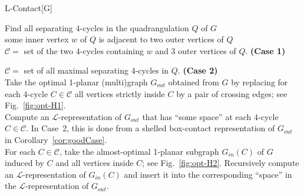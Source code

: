 \documentclass{article}
\newcommand{\LL}{$\mathcal{L}$\xspace}
\begin{document}
\hspace{-0.02\textwidth}
\parbox{0.97\textwidth}
{
\begin{algorithm}{L-Contact}[G]
	{
}



	Find all separating $4$-cycles in the quadrangulation $Q$ of $G$\\

	\qif some inner vertex $w$ of $Q$ is adjacent to two outer vertices of $Q$\\

		\qthen
		$\mathcal{C}=$ set of the two $4$-cycles containing $w$ and 3 outer vertices of $Q$.
		 \textbf{(Case 1)}

		\qelse
		$\mathcal{C}=$ set of all maximal separating $4$-cycles in $Q$.
		\textbf{(Case 2)}
	\qfi\\

	Take the optimal 1-planar (multi)graph $G_{out}$ obtained from $G$ by replacing
	for each $4$-cycle $C \in \mathcal{C}$ all vertices strictly inside $C$
	by a pair of crossing edges; see Fig.~\ref{fig:opt-H1}.
	\label{step:define_G_out}\\

	Compute an \LL-representation of $G_{out}$ that has ``some space'' at each $4$-cycle
	$C \in \mathcal{C}$. In Case~2, this is done from a shelled box-contact representation
	of $G_{out}$ in Corollary~\ref{cor:goodCase}.
	\label{step:G_out}\\

For each $C \in \mathcal{C}$, take the almost-optimal 1-planar
	subgraph $G_{in}(C)$ of $G$ induced by $C$ and all vertices inside $C$;
	see Fig.~\ref{fig:opt-H2}. Recursively compute an \LL-representation of $G_{in}(C)$
	and insert it into the corresponding ``space'' in the \LL-representation of $G_{out}$.
	\label{step:G_in}

\end{algorithm}
}
\end{document}
